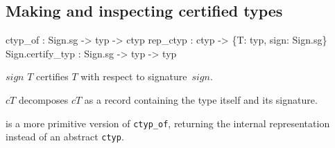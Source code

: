 \subsection{Making and inspecting certified types}
\begin{ttbox}
ctyp_of          : Sign.sg -> typ -> ctyp
rep_ctyp         : ctyp -> \{T: typ, sign: Sign.sg\}
Sign.certify_typ : Sign.sg -> typ -> typ
\end{ttbox}
\begin{ttdescription}
  
\item[\ttindexbold{ctyp_of} $sign$ $T$]  certifies
  $T$ with respect to signature~$sign$.
  
\item[\ttindexbold{rep_ctyp} $cT$] decomposes $cT$ as a record
  containing the type itself and its signature.
  
\item[\ttindexbold{Sign.certify_typ}] is a more primitive version of
  \texttt{ctyp_of}, returning the internal representation instead of
  an abstract \texttt{ctyp}.

\end{ttdescription}




